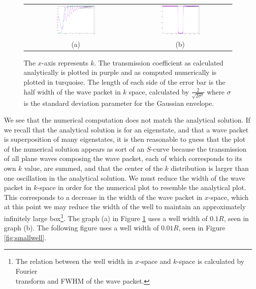 \documentclass[letterpaper,12pt]{article}
\begin{document}
    \begin{figure}[H]
        \centering
        \begin{tabular}{cc}
            \includegraphics[width=0.4\textwidth]{translarge.png}
            &
            \includegraphics[width=0.4\textwidth]{largewell.png}
            \\
            (a) & (b)
        \end{tabular}
        \caption[Large Well Transmission]{The $x$-axis represents $k$. The
        transmission coefficient as calculated analytically is plotted in purple
        and as computed numerically is plotted in turquoise. The length of each
        side of the error bar is the half width of the wave packet in $k$ space,
        calculated by $\frac{2}{\sqrt{2\sigma^2}}$ where $\sigma$ is the standard
        deviation parameter for the Gaussian envelope.}
        \label{translarge}
    \end{figure}

    We see that the numerical computation does not match the analytical solution.
    If we recall that the analytical solution is for an eigenstate,
    and that a wave packet is superposition of many eigenstates, it is then
    reasonable to guess that the plot of the numerical solution appears as
    sort of an $S$-curve because the transmission of all plane waves
    composing the wave packet, each of which corresponds to its own $k$ value,
    are summed, and that the center of the $k$ distribution is larger than one
    oscillation in the analytical solution. We must reduce the width of the wave
    packet in $k$-space in order for the numerical plot to resemble the
    analytical plot. This corresponds to a decrease in the width of the wave
    packet in $x$-space, which at this point we may reduce the width of the well
    to maintain an approximately infinitely large box\footnote[1]{The relation
    between the well width in $x$-space and $k$-space is calculated by Fourier\\
    transform and FWHM of the wave packet.}. The graph (a) in Figure
    \ref{translarge} uses a well width of $0.1R$, seen in graph (b). The
    following figure uses a well width of $0.01R$, seen in Figure
    \ref{fig:smallwell}.
\end{document}
